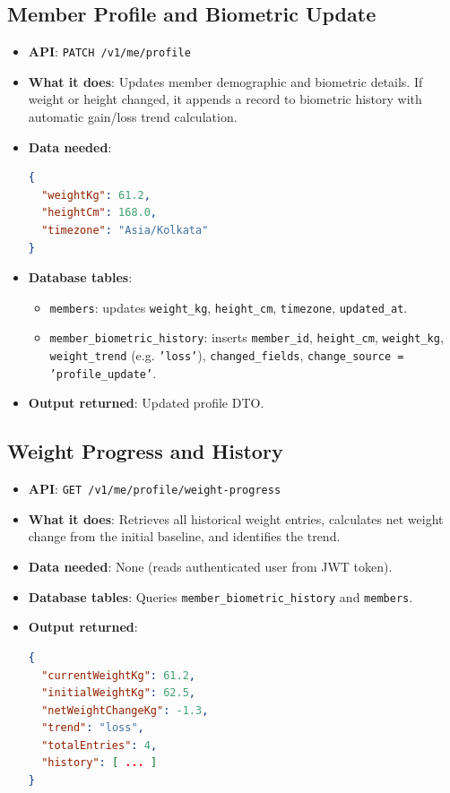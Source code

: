 \documentclass[11pt,a4paper]{article}
\begin{document}
\subsection{Member Profile and Biometric Update}
\begin{itemize}
    \item \textbf{API}: \texttt{PATCH /v1/me/profile}
    \item \textbf{What it does}: Updates member demographic and biometric details. If weight or height changed, it appends a record to biometric history with automatic gain/loss trend calculation.
    \item \textbf{Data needed}:
\begin{lstlisting}[language=json]
{
  "weightKg": 61.2,
  "heightCm": 168.0,
  "timezone": "Asia/Kolkata"
}
\end{lstlisting}
    \item \textbf{Database tables}:
    \begin{itemize}
        \item \texttt{members}: updates \texttt{weight\_kg}, \texttt{height\_cm}, \texttt{timezone}, \texttt{updated\_at}.
        \item \texttt{member\_biometric\_history}: inserts \texttt{member\_id}, \texttt{height\_cm}, \texttt{weight\_kg}, \texttt{weight\_trend} (e.g. \texttt{'loss'}), \texttt{changed\_fields}, \texttt{change\_source = 'profile\_update'}.
    \end{itemize}
    \item \textbf{Output returned}: Updated profile DTO.
\end{itemize}

\subsection{Weight Progress and History}
\begin{itemize}
    \item \textbf{API}: \texttt{GET /v1/me/profile/weight-progress}
    \item \textbf{What it does}: Retrieves all historical weight entries, calculates net weight change from the initial baseline, and identifies the trend.
    \item \textbf{Data needed}: None (reads authenticated user from JWT token).
    \item \textbf{Database tables}: Queries \texttt{member\_biometric\_history} and \texttt{members}.
    \item \textbf{Output returned}:
\begin{lstlisting}[language=json]
{
  "currentWeightKg": 61.2,
  "initialWeightKg": 62.5,
  "netWeightChangeKg": -1.3,
  "trend": "loss",
  "totalEntries": 4,
  "history": [ ... ]
}
\end{lstlisting}
\end{itemize}
\end{document}
